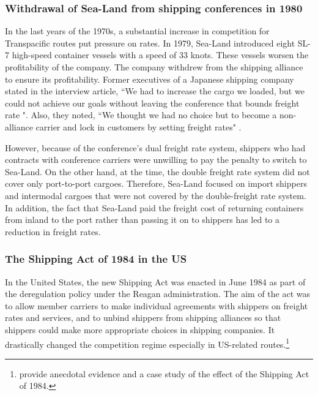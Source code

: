 \documentclass[11pt]{article}
\begin{document}
\subsubsection{Withdrawal of Sea-Land from shipping conferences in 1980}\label{subsec:withdrawal_of_sea-land_from_cartel_in_1980}
In the last years of the 1970s, a substantial increase in competition for Transpacific routes put pressure on rates. In 1979, Sea-Land introduced eight SL-7 high-speed container vessels with a speed of 33 knots. These vessels worsen the profitability of the company. The company withdrew from the shipping alliance to ensure its profitability. Former executives of a Japanese shipping company stated in the interview article, ``We had to increase the cargo we loaded, but we could not achieve our goals without leaving the conference that bounds freight rate  \citep{JapanMaritimeDaily2006}". Also, they noted, ``We thought we had no choice but to become a non-alliance carrier and lock in customers by setting freight rates" \citep{JapanMaritimeDaily2006}.

However, because of the conference's dual freight rate system, shippers who had contracts with conference carriers were unwilling to pay the penalty to switch to Sea-Land. On the other hand, at the time, the double freight rate system did not cover only port-to-port cargoes. Therefore, Sea-Land focused on import shippers and intermodal cargoes that were not covered by the double-freight rate system. In addition, the fact that Sea-Land paid the freight cost of returning containers from inland to the port rather than passing it on to shippers has led to a reduction in freight rates.

\subsubsection{The Shipping Act of 1984 in the US}\label{subsec:shipping_act_of_1984}

In the United States, the new Shipping Act was enacted in June 1984 as part of the deregulation policy under the Reagan administration. The aim of the act was to allow member carriers to make individual agreements with shippers on freight rates and services, and to unbind shippers from shipping alliances so that shippers could make more appropriate choices in shipping companies. It drastically changed the competition regime especially in US-related routes.\footnote{\cite{wilson1991some} provide anecdotal evidence and a case study of the effect of the Shipping Act of 1984.}  
\end{document}
